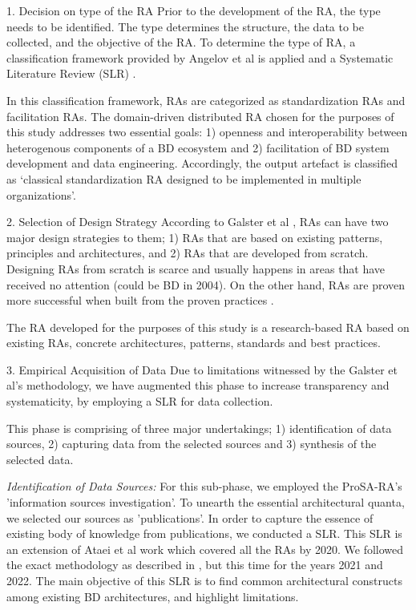 \documentclass[conference]{IEEEtran}
\begin{document}
\begin{LaTeXdescription}
\item[1. Decision on type of the RA] Prior to the development of the RA, the type needs to be identified. The type determines the structure, the data to be collected, and the objective of the RA. To determine the type of RA, a classification framework provided by Angelov et al \cite{angelov2009classification} is applied and a Systematic Literature Review (SLR) \cite{AtaeiACIS}. 

In this classification framework, RAs are categorized as standardization RAs and facilitation RAs. The domain-driven distributed RA chosen for the purposes of this study addresses two essential goals: 1) openness and interoperability between heterogenous components of a BD ecosystem and 2) facilitation of BD system development and data engineering. Accordingly, the output artefact is classified as `classical standardization RA designed to be implemented in multiple organizations'. 



\item[2. Selection of Design Strategy] According to Galster et al \cite{GALSTER}, RAs can have two major design strategies to them; 1) RAs that are based on existing patterns, principles and architectures, and 2) RAs that are developed from scratch. Designing RAs from scratch is scarce and usually happens in areas that have received no attention (could be BD in 2004). On the other hand, RAs are proven more successful when built from the proven practices \cite{Cloutier}. 

The RA developed for the purposes of this study is a research-based RA based on existing RAs, concrete architectures, patterns, standards and best practices.

\item[3. Empirical Acquisition of Data] Due to limitations witnessed by the Galster et al's methodology, we have augmented this phase to increase transparency and systematicity, by employing a SLR for data collection. 

This phase is comprising of three major undertakings; 1) identification of data sources, 2) capturing data from the selected sources and 3) synthesis of the selected data. 

\emph{Identification of Data Sources:} For this sub-phase, we employed the ProSA-RA's 'information sources investigation'. To unearth the essential architectural quanta, we selected our sources as 'publications'. In order to capture the essence of existing body of knowledge from publications, we conducted a SLR. This SLR is an extension of Ataei et al work \cite{AtaeiACIS} which covered all the RAs by 2020. We followed the exact methodology as described in \cite{AtaeiACIS}, but this time for the years 2021 and 2022. The main objective of this SLR is to find common architectural constructs among existing BD architectures, and highlight limitations.




\end{LaTeXdescription}
\end{document}
